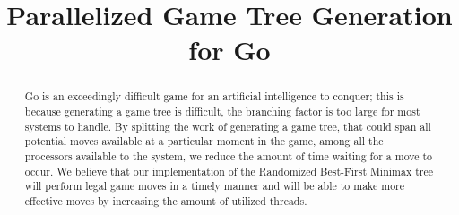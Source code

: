 \documentclass[conference]{IEEEtran}
\begin{document}
\title{Parallelized Game Tree Generation\\for Go}


\author{
}

\maketitle


\begin{abstract}
Go is an exceedingly difficult game for an artificial intelligence to conquer; this is because generating a game tree is difficult, the branching factor is too large for most systems to handle. By splitting the work of generating a game tree, that could span all potential moves available at a particular moment in the game, among all the processors available to the system, we reduce the amount of time waiting for a move to occur. We believe that our implementation of the Randomized Best-First Minimax tree will perform legal game moves in a timely manner and will be able to make more effective moves by increasing the amount of utilized threads.
\end{abstract}
\end{document}
